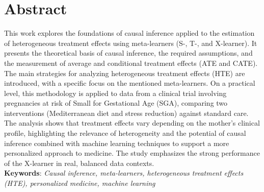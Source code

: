 \documentclass[../../main.tex]{subfiles}
\begin{document}
\section*{Abstract}
This work explores the foundations of causal inference applied to the estimation of heterogeneous treatment effects using meta-learners (S-, T-, and X-learner). It presents the theoretical basis of causal inference, the required assumptions, and the measurement of average and conditional treatment effects (ATE and CATE). The main strategies for analyzing heterogeneous treatment effects (HTE) are introduced, with a specific focus on the mentioned meta-learners. On a practical level, this methodology is applied to data from a clinical trial involving pregnancies at risk of Small for Gestational Age (SGA), comparing two interventions (Mediterranean diet and stress reduction) against standard care. The analysis shows that treatment effects vary depending on the mother’s clinical profile, highlighting the relevance of heterogeneity and the potential of causal inference combined with machine learning techniques to support a more personalized approach to medicine. The study emphasizes the strong performance of the X-learner in real, balanced data contexts.
\\
\small\textbf{Keywords}: \textit{Causal inference, meta-learners, heterogeneous treatment effects (HTE), personalized medicine, machine learning}
\end{document}
